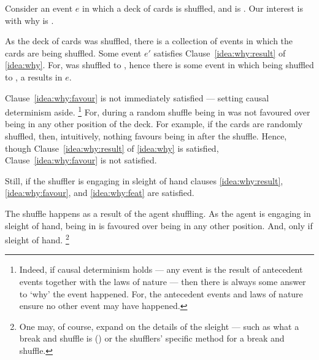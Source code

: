 \begin{note}
  Consider an event \(e\) in which a deck of cards is shuffled, and \mainCard{} is \mainCardPos{}.
  Our interest is with why \mainCard{} is \mainCardPos{}.

  As the deck of cards was shuffled, there is a collection of events in which the cards are being shuffled.
  Some event \(e'\) satisfies Clause~\ref{idea:why:result} of \autoref{idea:why}.
  For, \mainCard{} was shuffled to \mainCardPosX{}, hence there is some event in which \mainCard{} being shuffled to \mainCardPos{}, a results in \(e\).

  Clause~\ref{idea:why:favour} is not immediately satisfied --- setting causal determinism aside.%
  \footnote{
    \nocite{Hoefer:2023aa}%
    Indeed, if causal determinism holds --- any event is the result of antecedent events together with the laws of nature --- then there is always some answer to `why' the event happened.
    For, the antecedent events and laws of nature ensure no other event may have happened.
  }
  For, during a random shuffle \mainCard{} being in \mainCardPos{} was not favoured over \mainCard{} being in any other position of the deck.
  For example, if the cards are randomly shuffled, then, intuitively, nothing favours \mainCard{} being in \mainCardPos{} after the shuffle.
  Hence, though Clause~\ref{idea:why:result} of \autoref{idea:why} is satisfied, Clause~\ref{idea:why:favour} is not satisfied.

  Still, if the shuffler is engaging in sleight of hand clauses \ref{idea:why:result}, \ref{idea:why:favour}, and \ref{idea:why:feat} are satisfied.

  The shuffle happens as a result of the agent shuffling.
  As the agent is engaging in sleight of hand, \mainCard{} being in \mainCardPos{} is favoured over \mainCard{} being in any other position.
  And, only if sleight of hand.%
  \footnote{
    One may, of course, expand on the details of the sleight --- such as what a break and shuffle is (\cite[cf.][189--190]{Hilliard:1994aa}) or the shufflers' specific method for a break and shuffle.
  }
\end{note}



